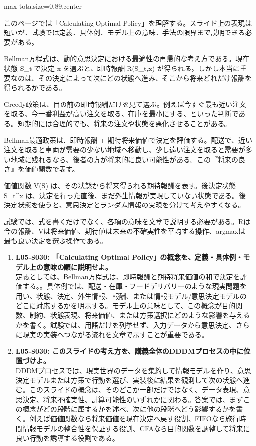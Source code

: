 \begin{minipage}[t]{0.58\textwidth}
\begin{adjustbox}{max totalsize={\textwidth}{0.89\textheight},center}
\begin{minipage}{\textwidth}\scriptsize
{}このページでは「Calculating Optimal Policy」を理解する。スライド上の表現は短いが、試験では定義、具体例、モデル上の意味、手法の限界まで説明できる必要がある。\par
Bellman方程式は、動的意思決定における最適性の再帰的な考え方である。現在状態 S\_t で決定 x を選ぶと、即時報酬 R(S\_t,x) が得られる。しかし本当に重要なのは、その決定によって次にどの状態へ進み、そこから将来どれだけ報酬を得られるかである。\par
Greedy政策は、目の前の即時報酬だけを見て選ぶ。例えば今すぐ最も近い注文を取る、今一番利益が高い注文を取る、在庫を最小にする、といった判断である。短期的には合理的でも、将来の注文や状態を悪化させることがある。\par
Bellman最適政策は、即時報酬 + 期待将来価値で決定を評価する。配送で、近い注文を取ると車両が需要の少ない地域へ移動し、少し遠い注文を取ると需要が多い地域に残れるなら、後者の方が将来的に良い可能性がある。この『将来の良さ』を価値関数で表す。\par
価値関数 V(S) は、その状態から将来得られる期待報酬を表す。後決定状態 S\_t\textasciicircum{}x は、決定を行った直後、まだ外生情報が実現していない状態である。後決定状態を使うと、意思決定とランダム情報の実現を分けて考えやすくなる。\par
試験では、式を書くだけでなく、各項の意味を文章で説明する必要がある。Rは今の報酬、Vは将来価値、期待値は未来の不確実性を平均する操作、argmaxは最も良い決定を選ぶ操作である。\par{}\begin{enumerate}\item \textbf{L05-S030: 「Calculating Optimal Policy」の概念を、定義・具体例・モデル上の意味の順に説明せよ。}\\定義としては、Bellman方程式は、即時報酬と期待将来価値の和で決定を評価する。。具体例では、配送・在庫・フードデリバリーのような現実問題を用い、状態、決定、外生情報、報酬、または情報モデル/意思決定モデルのどこに対応するかを明示する。モデル上の意味として、この概念が目的関数、制約、状態表現、将来価値、または方策選択にどのような影響を与えるかを書く。試験では、用語だけを列挙せず、入力データから意思決定、さらに現実の実装へつながる流れを文章で示すことが重要である。\item \textbf{L05-S030: このスライドの考え方を、講義全体のDDDMプロセスの中に位置づけよ。}\\DDDMプロセスでは、現実世界のデータを集約して情報モデルを作り、意思決定モデルまたは方策で行動を選び、実装後に結果を観測して次の状態へ進む。このスライドの概念は、そのどこか一部だけではなく、データ表現、意思決定、将来不確実性、計算可能性のいずれかに関わる。答案では、まずこの概念がどの段階に属するかを述べ、次に他の段階へどう影響するかを書く。例えば価値関数なら将来価値を現在決定へ戻す役割、FIFOなら旅行時間情報モデルの整合性を保証する役割、CFAなら目的関数を調整して将来に良い行動を誘導する役割である。\end{enumerate}

\end{minipage}
\end{adjustbox}
\end{minipage}
